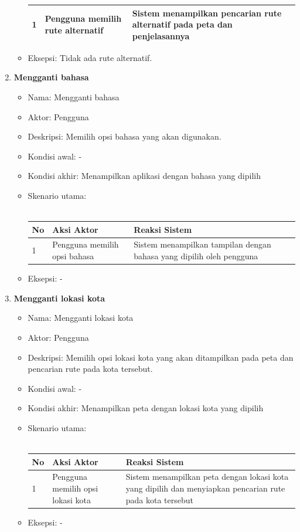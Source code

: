 \begin{enumerate}
\begin{itemize}
\begin{tabular}{|p{0.5cm} |p{6cm}| p{6cm}|}
							1 	& Pengguna memilih rute alternatif 	&	Sistem menampilkan pencarian rute alternatif pada peta dan penjelasannya \\ \hline 
						\end{tabular} 
			\item Eksepsi: Tidak ada rute alternatif.
		\end{itemize}
	\item \textbf{Mengganti bahasa}
	\begin{itemize}
			\item Nama: Mengganti bahasa
			\item Aktor: Pengguna
			\item Deskripsi: Memilih opsi bahasa yang akan digunakan.
			\item Kondisi awal: -
			\item Kondisi akhir: Menampilkan aplikasi dengan bahasa yang dipilih
			\item Skenario utama: \\ \\
				\begin{tabular}{|p{0.5cm} |p{6cm}| p{6cm}|}
						\hline
							No 	& Aksi Aktor & Reaksi Sistem \\ \hline
							1 	& Pengguna memilih opsi bahasa 	&	Sistem menampilkan tampilan dengan bahasa yang dipilih oleh pengguna \\ \hline 
						\end{tabular} 
			\item Eksepsi: -
		\end{itemize}
	\item \textbf{Mengganti lokasi kota}
	\begin{itemize}
			\item Nama: Mengganti lokasi kota
			\item Aktor: Pengguna
			\item Deskripsi: Memilih opsi lokasi kota yang akan ditampilkan pada peta dan pencarian rute pada kota tersebut.
			\item Kondisi awal: -
			\item Kondisi akhir: Menampilkan peta dengan lokasi kota yang dipilih
			\item Skenario utama: \\ \\
				\begin{tabular}{|p{0.5cm} |p{6cm}| p{6cm}|}
						\hline
							No 	& Aksi Aktor & Reaksi Sistem \\ \hline
							1 	& Pengguna memilih opsi lokasi kota 	&	Sistem menampilkan peta dengan lokasi kota yang dipilih dan menyiapkan pencarian rute pada kota tersebut \\ \hline 
						\end{tabular} 
			\item Eksepsi: -
		\end{itemize}
\end{enumerate}


